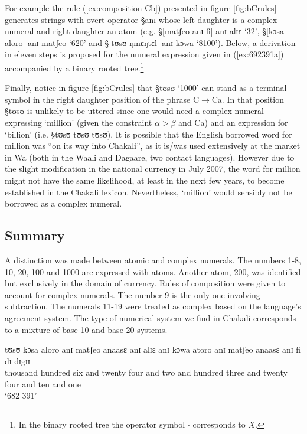   For example the rule (\ref{ex:composition-Cb}) presented in
figure \ref{fig:bCrules}
generates strings with overt operator {\S anɪ} whose left daughter is a complex
numeral and right daughter an
atom (e.g. {\S [matʃeo anɪ fi] anɪ alɪɛ} `32', {\S [kɔsa aloro] anɪ matʃeo}
`620' and  {\S [tʊsʊ
ŋmɛŋtɛl] anɪ kɔwa} `8100').  Below,  a  derivation
in eleven steps is
proposed for
the numeral expression given
in (\ref{ex:692391a}) accompanied by a binary rooted tree.\footnote{In the
binary rooted tree the operator symbol $\cdot$ corresponds to $X$.}


Finally, notice in figure  \ref{fig:bCrules} that {\S tʊsʊ} `1000' can stand as
a
terminal symbol in the right daughter position of the phrase {\W
C}$\rightarrow${\W C}{\W a}.
In that position  {\S tʊsʊ} is unlikely to be uttered since one would need a
complex numeral expressing `million'  (given the constraint $\alpha > \beta$
and {\W C}{\W a}) and  an expression for `billion'  (i.e. {\S tʊsʊ
tʊsʊ tʊsʊ}).  It is possible that
the English borrowed word for million was ``on its way into Chakali'', as it
is/was used
extensively at the market in Wa (both in the Waali and Dagaare, two
contact languages).  However due to the slight modification in the national
currency in July 2007, the word for million might not have the same likelihood,
at least in the next few years, to become established in the Chakali lexicon.
Nevertheless, `million' would sensibly not be borrowed as a complex numeral. 


\subsection{Summary}
\label{sec:NUM-summary}

A distinction was made between atomic and complex numerals. The numbers
1-8, 10, 20, 100 and 1000 are expressed with atoms. Another atom, 200, was
identified but
exclusively in the domain of currency. Rules of composition were
given to account for  complex numerals. The number 9 is the only one
involving subtraction. The numerals
11-19 were treated as complex based on the language's agreement system.
The type of numerical system we find in Chakali corresponds to a
mixture of base-10 and base-20 systems.  


\newpage

\begin{exe}

 \gll tʊsʊ kɔsa aloro anɪ matʃeo anaasɛ anɪ alɪɛ anɪ kɔwa atoro anɪ matʃeo
anaasɛ anɪ fi dɪ dɪgɪɪ \\
{thousand} {hundred} {six} {and} {twenty} {four} {and} {two} {and} {hundred}
{three} {and} {twenty} {four} {and} {ten}  {and} {one}\\
\glt `682 391'
\end{exe}



